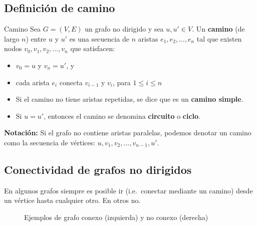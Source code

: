 \subsection{Definición de camino}

\begin{definitionblock}{Camino}
Sea $G = (V,E)$ un grafo no dirigido y sea $u,u' \in V$. Un \textbf{camino} (de largo $n$) entre $u$ y $u'$ es una secuencia de $n$ aristas $e_1, e_2, \ldots, e_n$ tal que existen nodos $v_0,v_1,v_2,\dots,v_n$ que satisfacen:
\begin{itemize}
  \item $v_0 = u$ y $v_n = u'$, y
  \item cada arista $e_i$ conecta $v_{i-1}$ y $v_i$, para $1 \leq i \leq n$
\end{itemize}
\end{definitionblock}

\begin{itemize}
  \item Si el camino no tiene aristas repetidas, se dice que es un \textbf{camino simple}.
  \item Si $u = u'$, entonces el camino se denomina \textbf{circuito} o \textbf{ciclo}.
\end{itemize}

\textbf{Notación:} Si el grafo no contiene aristas paralelas, podemos denotar un camino como la secuencia de vértices: $u,v_1,v_2,\ldots,v_{n-1},u'$.


\subsection{Conectividad de grafos no dirigidos}
En algunos grafos siempre es posible ir (i.e.~conectar mediante un camino) desde un vértice hasta cualquier otro. En otros no.

\begin{figure}[h!]
  \centering
  \caption{Ejemplos de grafo conexo (izquierda) y no conexo (derecha)}
\end{figure}


